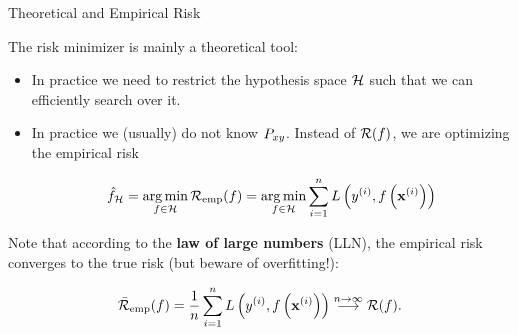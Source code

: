 \documentclass[11pt,compress,t,notes=noshow, xcolor=table]{beamer}
\begin{document}
\begin{vbframe}{Theoretical and Empirical Risk}  
 

The risk minimizer is mainly a theoretical tool: 

\begin{itemize}
	\item In practice we need to restrict the hypothesis space $\mathcal{H}$ such that we can efficiently search over it. 
	\item In practice we (usually) do not know $P_{xy}$. Instead of $\mathcal{R}(f)$, we are optimizing the empirical risk

	\begin{eqnarray*}
		{\hat f}_{\mathcal{H}} = \operatorname*{arg\,min}_{f \in \mathcal{H}} \mathcal{R}_{\text{emp}}(f) = \operatorname*{arg\,min}_{f \in \mathcal{H}} \sum\limits_{i=1}^n L\left(y^{(i)}, f\left(\mathbf{x}^{(i)}\right)\right)
	\end{eqnarray*}

\end{itemize}

Note that according to the \textbf{law of large numbers} (LLN), the empirical risk converges to the true risk (but beware of overfitting!): 

\begin{eqnarray*}
	\bar{\mathcal{R}}_\text{emp}(f) = \frac{1}{n} \sum\limits_{i=1}^n L\left(y^{(i)}, f\left(\mathbf{x}^{(i)}\right)\right) \overset{n \to \infty}{\longrightarrow} \mathcal{R}(f). 
\end{eqnarray*}

\end{vbframe}
\end{document}
